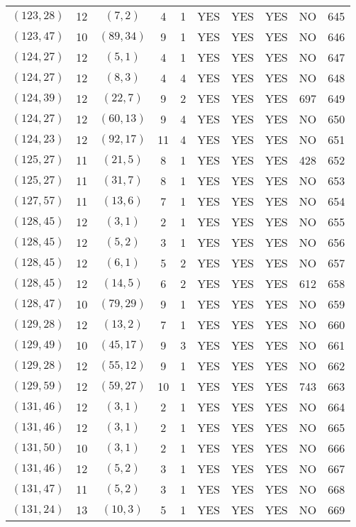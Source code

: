 \begin{longtable}{|c|c|c|c|c|c|c|c|c|c|}
$(123, 28)$ & 12 & $(7, 2)$ & 4 & 1 & YES & YES & YES & NO & 645\\
$(123, 47)$ & 10 & $(89, 34)$ & 9 & 1 & YES & YES & YES & NO & 646\\
$(124, 27)$ & 12 & $(5, 1)$ & 4 & 1 & YES & YES & YES & NO & 647\\
$(124, 27)$ & 12 & $(8, 3)$ & 4 & 4 & YES & YES & YES & NO & 648\\
$(124, 39)$ & 12 & $(22, 7)$ & 9 & 2 & YES & YES & YES & 697 & 649\\
$(124, 27)$ & 12 & $(60, 13)$ & 9 & 4 & YES & YES & YES & NO & 650\\
$(124, 23)$ & 12 & $(92, 17)$ & 11 & 4 & YES & YES & YES & NO & 651\\
$(125, 27)$ & 11 & $(21, 5)$ & 8 & 1 & YES & YES & YES & 428 & 652\\
$(125, 27)$ & 11 & $(31, 7)$ & 8 & 1 & YES & YES & YES & NO & 653\\
$(127, 57)$ & 11 & $(13, 6)$ & 7 & 1 & YES & YES & YES & NO & 654\\
$(128, 45)$ & 12 & $(3, 1)$ & 2 & 1 & YES & YES & YES & NO & 655\\
$(128, 45)$ & 12 & $(5, 2)$ & 3 & 1 & YES & YES & YES & NO & 656\\
$(128, 45)$ & 12 & $(6, 1)$ & 5 & 2 & YES & YES & YES & NO & 657\\
$(128, 45)$ & 12 & $(14, 5)$ & 6 & 2 & YES & YES & YES & 612 & 658\\
$(128, 47)$ & 10 & $(79, 29)$ & 9 & 1 & YES & YES & YES & NO & 659\\
$(129, 28)$ & 12 & $(13, 2)$ & 7 & 1 & YES & YES & YES & NO & 660\\
$(129, 49)$ & 10 & $(45, 17)$ & 9 & 3 & YES & YES & YES & NO & 661\\
$(129, 28)$ & 12 & $(55, 12)$ & 9 & 1 & YES & YES & YES & NO & 662\\
$(129, 59)$ & 12 & $(59, 27)$ & 10 & 1 & YES & YES & YES & 743 & 663\\
$(131, 46)$ & 12 & $(3, 1)$ & 2 & 1 & YES & YES & YES & NO & 664\\
$(131, 46)$ & 12 & $(3, 1)$ & 2 & 1 & YES & YES & YES & NO & 665\\
$(131, 50)$ & 10 & $(3, 1)$ & 2 & 1 & YES & YES & YES & NO & 666\\
$(131, 46)$ & 12 & $(5, 2)$ & 3 & 1 & YES & YES & YES & NO & 667\\
$(131, 47)$ & 11 & $(5, 2)$ & 3 & 1 & YES & YES & YES & NO & 668\\
$(131, 24)$ & 13 & $(10, 3)$ & 5 & 1 & YES & YES & YES & NO & 669\\

\end{longtable}
